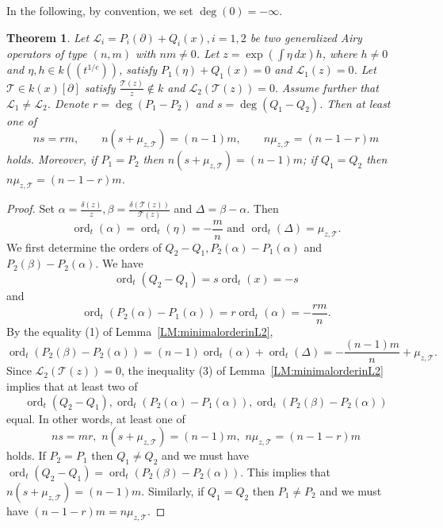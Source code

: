 \documentclass{article}
\newtheorem{theorem}{Theorem}[section]
\DeclareMathOperator{\ord}{ord}
\newcommand{\calL}{{\mathcal{L}}}
\newcommand{\calT}{{\mathcal{T}}}
\begin{document}
In the following, by convention, we set $\deg(0)=-\infty$.
\begin{theorem}
  \label{THM:degreeobstruction}
Let
$
  \calL_i=P_i(\partial)+Q_i(x), i=1,2 
$
be two generalized Airy operators of type $(n,m)$ with $nm\neq 0$.
Let $z=\exp\left(\int \eta\,dx\right)h$, where $h\neq 0$ and
$\eta,h\in k((t^{1/e}))$, satisfy
$
  P_1(\eta)+Q_1(x)=0
$
and $\calL_1(z)=0$.
Let $\calT\in k(x)[\partial]$ satisfy
$
  \frac{\calT(z)}{z}\notin k
$
and $\calL_2(\calT(z))=0.$ Assume further that $\calL_1\neq \calL_2$. 
Denote $r=\deg(P_1-P_2)$ and $s=\deg(Q_1-Q_2)$. Then at least one of 
\[
  ns=rm,\qquad n(s+\mu_{z,\calT})=(n-1)m,\qquad
  n\mu_{z,\calT}=(n-1-r)m
\]
holds. Moreover, if $P_1=P_2$ then $n(s+\mu_{z,\calT})=(n-1)m$;
  if $Q_1=Q_2$ then $n\mu_{z,\calT}=(n-1-r)m$.
\end{theorem}
\begin{proof}
  Set $\alpha=\frac{\delta(z)}{z},\beta=\frac{\delta(\calT(z))}{\calT(z)}$ and 
  $\Delta=\beta-\alpha$. Then 
  $$
     \ord_t(\alpha)=\ord_t(\eta)=-\frac{m}{n}\,\,\text{and}\,\,\ord_t(\Delta)=\mu_{z,\calT}.
  $$
  We first determine the orders of $Q_2-Q_1, P_2(\alpha)-P_1(\alpha)$
  and $P_2(\beta)-P_2(\alpha)$. We have 
  $$\ord_t(Q_2-Q_1)=s\ord_t(x)=-s$$
and 
$$
  \ord_t(P_2(\alpha)-P_1(\alpha))=r\ord_t(\alpha)=-\frac{rm}{n}.
$$
By the equality (1) of Lemma~\ref{LM:minimalorderinL2}, 
$$
   \ord_t(P_2(\beta)-P_2(\alpha))=(n-1)\ord_t(\alpha)+\ord_t(\Delta)=-\frac{(n-1)m}{n}+\mu_{z,\calT}.
$$
Since $\calL_2(\calT(z))=0$, 
the inequality (3) of Lemma~\ref{LM:minimalorderinL2} implies that at least two of 
$$
   \ord_t(Q_2-Q_1), \ord_t(P_2(\alpha)-P_1(\alpha)), \ord_t(P_2(\beta)-P_2(\alpha))
$$
equal. In other words, at least one of 
$$
   ns=mr, \,\,n(s+\mu_{z,\calT})=(n-1)m,\,\, n\mu_{z,\calT}=(n-1-r)m
$$
holds. If $P_2=P_1$ then $Q_1\neq Q_2$ and we must have 
$\ord_t(Q_2-Q_1)=\ord_t(P_2(\beta)-P_2(\alpha))$. This implies that $n(s+\mu_{z,\calT})=(n-1)m$. Similarly, if $Q_1=Q_2$ then $P_1\neq P_2$ and we must have 
$(n-1-r)m=n\mu_{z,\calT}$.
\end{proof}
\end{document}
